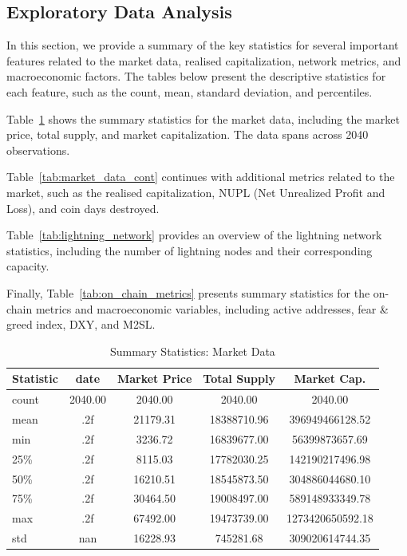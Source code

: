 \subsection{Exploratory Data Analysis}\label{sec:exploratory_data_analysis}

In this section, we provide a summary of the key statistics for several important features related to the market data,
realised capitalization, network metrics, and macroeconomic factors. The tables below present the descriptive
statistics for each feature, such as the count, mean, standard deviation, and percentiles.

Table\ \ref{tab:market_data} shows the summary statistics for the market data, including the market price, total supply,
and market capitalization. The data spans across 2040 observations.

Table\ \ref{tab:market_data_cont} continues with additional metrics related to the market,
such as the realised capitalization, NUPL (Net Unrealized Profit and Loss), and coin days destroyed.

Table\ \ref{tab:lightning_network} provides an overview of the lightning network statistics,
including the number of lightning nodes and their corresponding capacity.

Finally, Table\ \ref{tab:on_chain_metrics} presents summary statistics for the on-chain metrics and
macroeconomic variables, including active addresses, fear \& greed index, DXY, and M2SL.\

\begin{table}[ht]
    \centering
    \begin{tabular}{|l|c|c|c|c|}
    \hline
    Statistic & date    & Market Price & Total Supply & Market Cap. \\ \hline
    count     & 2040.00 & 2040.00      & 2040.00      & 2040.00     \\ \hline
    mean      & .2f     & 21179.31     & 18388710.96  & 396949466128.52 \\ \hline
    min       & .2f     & 3236.72      & 16839677.00  & 56399873657.69  \\ \hline
    25\%      & .2f     & 8115.03      & 17782030.25  & 142190217496.98 \\ \hline
    50\%      & .2f     & 16210.51     & 18545873.50  & 304886044680.10 \\ \hline
    75\%      & .2f     & 30464.50     & 19008497.00  & 589148933349.78 \\ \hline
    max       & .2f     & 67492.00     & 19473739.00  & 1273420650592.18 \\ \hline
    std       & nan     & 16228.93     & 745281.68    & 309020614744.35 \\ \hline
    \end{tabular}
    \caption{Summary Statistics: Market Data}
    \label{tab:market_data}
\end{table}

